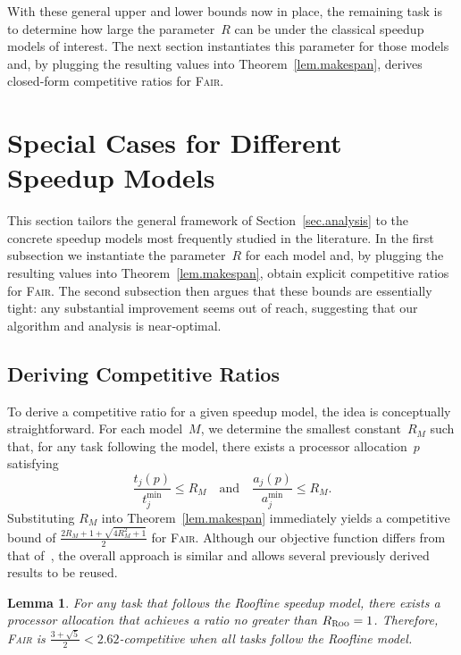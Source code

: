 \documentclass{article}
\newtheorem{lemma}{Lemma}
\newcommand\fair{\textsc{Fair}\xspace}
\newcommand\ratio{R\xspace}
\newcommand\ROO{\textsc{Roo}\xspace}
\begin{document}
\medskip
With these general upper and lower bounds now in place, the remaining task is to determine how large the parameter~$\ratio$ can be under the classical speedup models of interest.  The next section instantiates this parameter for those models and, by plugging the resulting values into Theorem~\ref{lem.makespan}, derives closed‑form competitive ratios for \fair.

\section{Special Cases for Different Speedup Models}
\label{sec.anamodel}
This section tailors the general framework of Section~\ref{sec.analysis} to the concrete speedup models most frequently studied in the literature.  In the first subsection we instantiate the parameter~$\ratio$ for each model and, by plugging the resulting values into Theorem~\ref{lem.makespan}, obtain explicit competitive ratios for \fair.  The second subsection then argues that these bounds are essentially tight:  any substantial improvement seems out of reach, suggesting that our algorithm and analysis is near‑optimal.


\subsection{Deriving Competitive Ratios}

To derive a competitive ratio for a given speedup model, the idea is conceptually straightforward.  
For each model~$M$, we determine the smallest constant~$\ratio_M$ such that, for any task following the model, there exists a processor allocation~$p$ satisfying
\[
\frac{t_j(p)}{t_j^{\min}} \le \ratio_M
\quad \text{and} \quad
\frac{a_j(p)}{a_j^{\min}} \le \ratio_M .
\]
Substituting $\ratio_M$ into Theorem~\ref{lem.makespan} immediately yields a competitive bound of $\frac{2\ratio_M + 1 + \sqrt{4\ratio_M^2 + 1}}{2}$ for \fair.  
Although our objective function differs from that of~\cite{TOPC24}, the overall approach is similar and allows several previously derived results to be reused.


\begin{lemma}\label{lem.roofline}
For any task that follows the Roofline speedup model, there exists a processor allocation that achieves a ratio no greater than $\ratio_{\ROO} = 1$.  
Therefore, \fair is $\frac{3 + \sqrt{5}}{2} <2.62$-competitive when all tasks follow the Roofline model.
\end{lemma}
\end{document}

